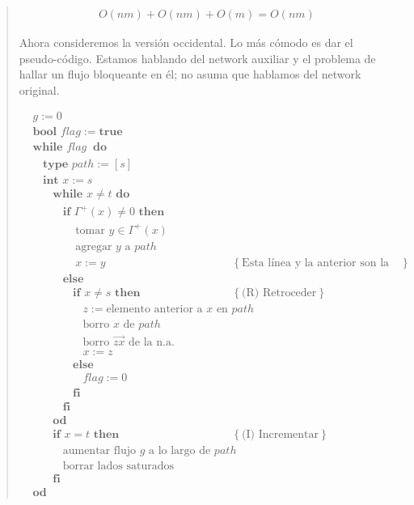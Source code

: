 \documentclass[a4paper]{article}
\begin{document}
\begin{quote}
\begin{align*}
    O(nm) + O(nm) + O(m) = O(nm)
\end{align*}

Ahora consideremos la versión occidental. Lo más cómodo es dar el
pseudo-código. Estamos hablando del network auxiliar y el problema de hallar un
flujo bloqueante en él; no asuma que hablamos del network original.

\begin{align*}
    &g := 0 \\ 
    &\textbf{bool } flag := \textbf{true} \\ 
    &\textbf{while } flag ~ \textbf{ do} \\ 
    & ~ ~ ~ ~ \textbf{type } path := [s] \\ 
    & ~ ~ ~ ~ \textbf{int } x := s \\ 
    & ~ ~ ~ ~ ~ ~ ~ ~ \textbf{while } x \neq t \textbf{ do } \\ 
    & ~ ~ ~ ~ ~ ~ ~ ~ ~ ~ ~ ~ \textbf{if } \Gamma^{+}(x) \neq 0 \textbf{ then } \\ 
    & ~ ~ ~ ~ ~ ~ ~ ~ ~ ~ ~ ~ ~ ~ ~ ~ ~ \text{tomar } y \in \Gamma^{+}(x) \\ 
    & ~ ~ ~ ~ ~ ~ ~ ~ ~ ~ ~ ~ ~ ~ ~ ~ ~ \text{agregar } y \text{ a } path \\ 
    & ~ ~ ~ ~ ~ ~ ~ ~ ~ ~ ~ ~ ~ ~ ~ ~ ~ x := y &\left\{ \text{Esta línea y la anterior son la parte (A) de avanzar} \right\}  \\ 
    & ~ ~ ~ ~ ~ ~ ~ ~ ~ ~ ~ ~ \textbf{else }  \\ 
    & ~ ~ ~ ~ ~ ~ ~ ~ ~ ~ ~ ~ ~ ~ ~ ~ \textbf{if } x \neq s \textbf{ then }  &\left\{ \text{(R) Retroceder} \right\} \\ 
    & ~ ~ ~ ~ ~ ~ ~ ~ ~ ~ ~ ~ ~ ~ ~ ~ ~ ~ ~ ~ z := \text{elemento anterior a $x$ en  } path  \\ 
    & ~ ~ ~ ~ ~ ~ ~ ~ ~ ~ ~ ~ ~ ~ ~ ~ ~ ~ ~ ~ \text{borro } x \text{ de } path\\ 
    & ~ ~ ~ ~ ~ ~ ~ ~ ~ ~ ~ ~ ~ ~ ~ ~ ~ ~ ~ ~ \text{borro } \overrightarrow{zx} \text{ de la n.a.}\\ 
    & ~ ~ ~ ~ ~ ~ ~ ~ ~ ~ ~ ~ ~ ~ ~ ~ ~ ~ ~ ~ x := z\\ 
    & ~ ~ ~ ~ ~ ~ ~ ~ ~ ~ ~ ~ ~ ~ ~ ~ \textbf{else }   \\ 
    & ~ ~ ~ ~ ~ ~ ~ ~ ~ ~ ~ ~ ~ ~ ~ ~ ~ ~ ~ ~ flag := 0   \\ 
    & ~ ~ ~ ~ ~ ~ ~ ~ ~ ~ ~ ~ ~ ~ ~ ~\textbf{fi} \\ 
    & ~ ~ ~ ~ ~ ~ ~ ~ ~ ~ ~ ~ \textbf{fi}\\
    & ~ ~ ~ ~ ~ ~ ~ ~ \textbf{od } \\
    & ~ ~ ~ ~ ~ ~ ~ ~ \textbf{if } x = t \textbf{ then } &\left\{ \text{(I) Incrementar} \right\}  \\ 
    & ~ ~ ~ ~ ~ ~ ~ ~ ~ ~ ~ ~ \text{aumentar flujo $g$ a lo largo de } path \\
    & ~ ~ ~ ~ ~ ~ ~ ~ ~ ~ ~ ~ \text{borrar lados saturados} \\ 
    & ~ ~ ~ ~ ~ ~ ~ ~ \textbf{fi}\\
    &\textbf{od}
\end{align*}

\end{quote}
\normalsize
\end{document}
